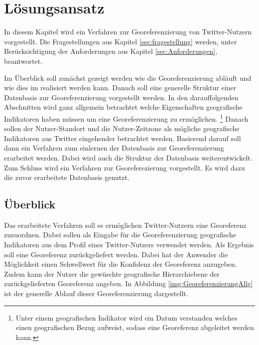 \chapter{Lösungsansatz} \label{chp:Loesungsansatz}
	In diesem Kapitel wird ein Verfahren zur Georeferenzierung von Twitter-Nutzern vorgestellt.
	Die Fragestellungen aus Kapitel \ref{sec:fragestellung} werden, unter Berücksichtigung der Anforderungen aus Kapitel \ref{sec:Anforderungen}, beantwortet.  

	Im Überblick soll zunächst gezeigt werden wie die Georeferenzierung abläuft und wie dies im realisiert werden kann.
	Danach soll eine generelle Struktur einer Datenbasis zur Georeferenzierung vorgestellt werden.
	In den darauffolgenden Abschnitten wird ganz allgemein betrachtet welche Eigenschaften geografische Indikatoren haben müssen um eine Georeferenzierung zu ermöglichen.
	\footnote{Unter einem geografischen Indikator wird ein Datum verstanden welches einen geografischen Bezug aufweist, sodass eine Georeferenz abgeleitet werden kann.}
	Danach sollen der Nutzer-Standort und die Nutzer-Zeitzone als mögliche geografische Indikatoren aus Twitter eingehender betrachtet werden. 
	Basierend darauf soll dann ein Verfahren zum einlernen der Datenbasis zur Georeferenzierung erarbeitet werden.
	Dabei wird auch die Struktur der Datenbasis weiterentwickelt.
	Zum Schluss wird ein Verfahren zur Georeferezierung vorgestellt.
	Es wird dazu die zuvor erarbeitete Datenbasis genutzt. 

	\section{Überblick} \label{sec:ueberblick} 
		
		Das erarbeitete Verfahren soll es ermöglichen Twitter-Nutzern eine Georeferenz zuzuordnen.
		Dabei sollen als Eingabe für die Georeferenzierung geografische Indikatoren aus dem Profil eines Twitter-Nutzers verwendet werden.
		Als Ergebnis soll eine Georeferenz zurückgeliefert werden. 
		Dabei hat der Anwender die Möglichkeit einen Schwellwert für die Konfidenz der Georeferenz anzugeben.
		Zudem kann der Nutzer die gewüschte geografische Hierarchiebene der zurückgelieferten Georeferenz angeben. 
		In Abbildung \ref{img:GeoreferenzierungAllg} ist der generelle Ablauf dieser Georeferenzierung dargestellt. 

